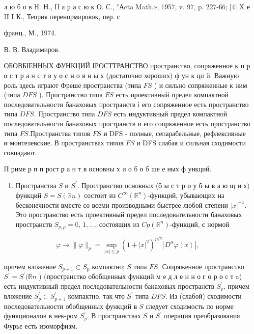 \documentclass[10pt]{article}
\begin{document}
л ю б о в Н. Н., II а р а с ю к О. С., "Аcta Math.», 1957, v. 97, p. 227-66; [4] X е II I К., Теория перенормировок, пер. с

франц., М., 1974.

В. В. Владимиров.



ОБОВБІЕННЫХ ФУНКЦИЙ ІРОСТТРАНСТВО пространство, сопряженное к п р о с т р а н с т в у о с н о в н ы х (достаточно хороших) ф ун к ци й. Важную роль здесь играют Фреше пространства (типа $F S$ ) и сильно сопряженные к ним (типа $D F S$ ). Пространство типа $F S$ есть проективный предел компактной последовательности банаховых пространств і его сопряженное есть пространство типа $D F S$. Пространство типа $D F S$ есть индуктивный предел компактной последовательности банаховых пространств и его сопряженное есть пространство типа $F S$.Пространства типов $F S$ и DFS - полные, сепарабельные, рефлексивные и монтелевские. В пространствах типов $F S$ и DFS слабая и сильная сходимости совпадают.



П риме р п п рост р а н т в основны х и о б о б ше е ных ф ункций.



\begin{enumerate}

  \item Пространства $S$ и $S^{\prime}$. Пространство основных (б ы с т р о у б ы в а ю щ и х) функций $S=S(\mathbb{R} n)$ состоит из $C^{\infty}\left(\mathbb{R}^{n}\right)$-функций, убывающих на бесконечности вместе со всеми производными быстрее любой степени $|x|^{-1}$. Это пространство есть проективный предел последовательности банаховых пространств $S_{p, p}=0$, $1, \ldots$, состоящих из $C p\left(\mathbb{R}^{n}\right)$-функций, с нормой

\end{enumerate}



\[

\varphi \rightarrow\|\varphi\|_{p}=\sup _{|\alpha| \leqslant p}\left(1+|x|^{2}\right)^{p / 2}\left|D^{\alpha} \varphi(x)\right|,

\]



причем вложение $S_{p+1} \subset S_{p}$ компактно; $S$ типа $F S$. Сопряженное пространство $S^{\prime}=S^{\prime}(\mathbb{R} n$ ) (пространстко обобщенных функций м е д л е н н о г о р о с т a) есть индуктивный предел последовательности банаховых пространств $S_{p}^{\prime}$, причем вложение $S_{p}^{\prime} \subset S_{p+1}^{\prime}$ компактно, так что $S^{\prime}$ типа $D F S$. Из (слабой) сходимости последовательности обобщенных функций в $S$ следует сходимость по норме функционалов в нек-ром $S_{p}^{\prime}$. В пространствах $S$ и $S^{\prime}$ операция преобразования Фурье есть изоморфизм.
\end{document}
